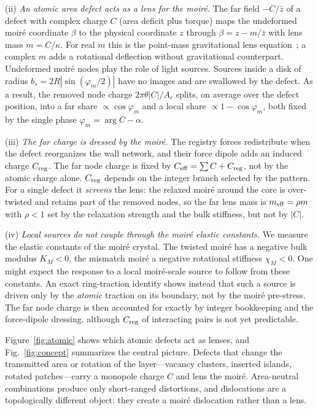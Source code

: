 \documentclass[prb,twocolumn,superscriptaddress,floatfix,10pt]{revtex4-2}
\begin{document}
(ii) \emph{An atomic area defect acts as a lens for the moir\'e.} The far field $-C/\bar z$ of a defect with complex charge $C$ (area deficit plus torque) maps the undeformed moir\'e coordinate $\beta$ to the physical coordinate $z$ through $\beta=z-m/\bar z$ with lens mass $m=C/\kappa$. For real $m$ this is the point-mass gravitational lens equation~\cite{Einstein1936,Schneider1992}; a complex $m$ adds a rotational deflection without gravitational counterpart. Undeformed moir\'e nodes play the role of light sources. Sources inside a disk of radius $b_s=2R|\sin(\varphi_m/2)|$ have no images and are swallowed by the defect. As a result, the removed node charge $2\pi\theta|C|/A_c$ splits, on average over the defect position, into a far share $\propto\cos\varphi_m$ and a local share $\propto 1-\cos\varphi_m$, both fixed by the single phase $\varphi_m=\arg C-\alpha$.

(iii) \emph{The far charge is dressed by the moir\'e.} The registry forces redistribute when the defect reorganizes the wall network, and their force dipole adds an induced charge $C_{\rm reg}$. The far node charge is fixed by $C_{\rm eff}=\sum C+C_{\rm reg}$, not by the atomic charge alone. $C_{\rm reg}$ depends on the integer branch selected by the pattern. For a single defect it \emph{screens} the lens: the relaxed moir\'e around the core is over-twisted and retains part of the removed nodes, so the far lens mass is $m_{\rm eff}=\rho m$ with $\rho<1$ set by the relaxation strength and the bulk stiffness, but not by $|C|$.

(iv) \emph{Local sources do not couple through the moir\'e elastic constants.} We measure the elastic constants of the moir\'e crystal. The twisted moir\'e has a negative bulk modulus $K_M<0$, the mismatch moir\'e a negative rotational stiffness $\chi_M<0$. One might expect the response to a local moir\'e-scale source to follow from these constants. An exact ring-traction identity shows instead that such a source is driven only by the \emph{atomic} traction on its boundary, not by the moir\'e pre-stress. The far node charge is then accounted for exactly by integer bookkeeping and the force-dipole dressing, although $C_{\rm reg}$ of interacting pairs is not yet predictable.

Figure~\ref{fig:atomic} shows which atomic defects act as lenses, and Fig.~\ref{fig:concept} summarizes the central picture. Defects that change the transmitted area or rotation of the layer---vacancy clusters, inserted islands, rotated patches---carry a monopole charge $C$ and lens the moir\'e. Area-neutral combinations produce only short-ranged distortions, and dislocations are a topologically different object: they create a moir\'e dislocation rather than a lens.
\end{document}
